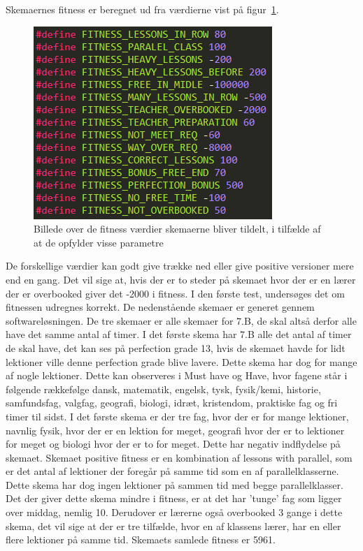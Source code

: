 Skemaernes fitness er beregnet ud fra værdierne vist på figur~\ref{fitnessvalues}.

\begin{figure}[!h]
\includegraphics[scale = 2]{partials/graphics/fitness.png}
\caption{Billede over de fitness værdier skemaerne bliver tildelt, i tilfælde af at de opfylder visse parametre}
\label{fitnessvalues}
\end{figure}
De forskellige værdier kan godt give trække ned eller give positive versioner mere end en gang. Det vil sige at, hvis der er to steder på skemaet hvor der er en lærer der er overbooked giver det -2000 i fitness.
I den første test, undersøges det om fitnessen udregnes korrekt. De nedenstående skemaer er generet gennem softwareløsningen. De tre skemaer er alle skemaer for 7.B, de skal altså derfor alle have det samme antal af timer. 
I det første skema har 7.B alle det antal af timer de skal have, det kan ses på perfection grade 13, hvis de skemaet havde for lidt lektioner ville denne perfection grade blive lavere. Dette skema har dog for mange af nogle lektioner. Dette kan observeres i Must have og Have, hvor fagene står i følgende rækkefølge dansk, matematik, engelsk, tysk, fysik/kemi, historie, samfundsfag, valgfag, geografi, biologi, idræt, kristendom, praktiske fag og fri timer til sidst. I det første skema er der tre fag, hvor der er for mange lektioner, navnlig fysik, hvor der er en lektion for meget, geografi hvor der er to lektioner for meget og biologi hvor der er to for meget. Dette har negativ indflydelse på skemaet.
Skemaet positive fitness er en kombination af lessons with parallel, som er det antal af lektioner der foregår på samme tid som en af parallelklasserne. Dette skema har dog ingen lektioner på sammen tid med begge parallelklasser. Det der giver dette skema mindre i fitness, er at det har ’tunge’ fag som ligger over middag, nemlig 10. Derudover er lærerne også overbooked 3 gange i dette skema, det vil sige at der er tre tilfælde, hvor en af klassens lærer, har en eller flere lektioner på samme tid. Skemaets samlede fitness er 5961. 
